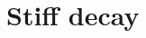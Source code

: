 \documentclass[aspectratio=169, 10pt, handout,usenames,dvipsnames]{beamer}
\begin{document}
\section{Stiff decay}\label{sec:sec11}    

    
\end{document}

